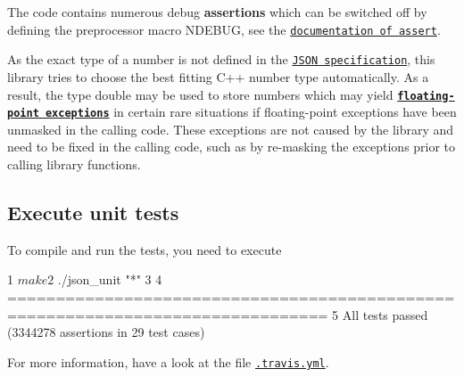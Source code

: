 \begin{DoxyItemize}
\item The code contains numerous debug {\bfseries assertions} which can be switched off by defining the preprocessor macro {\ttfamily N\+D\+E\+B\+UG}, see the \href{http://en.cppreference.com/w/cpp/error/assert}{\tt documentation of {\ttfamily assert}}.
\item As the exact type of a number is not defined in the \href{http://rfc7159.net/rfc7159}{\tt J\+S\+ON specification}, this library tries to choose the best fitting C++ number type automatically. As a result, the type {\ttfamily double} may be used to store numbers which may yield \href{https://github.com/nlohmann/json/issues/181}{\tt {\bfseries floating-\/point exceptions}} in certain rare situations if floating-\/point exceptions have been unmasked in the calling code. These exceptions are not caused by the library and need to be fixed in the calling code, such as by re-\/masking the exceptions prior to calling library functions.
\end{DoxyItemize}

\subsection*{Execute unit tests}

To compile and run the tests, you need to execute


\begin{DoxyCode}
1 $ make
2 $ ./json\_unit "*"
3 
4 ===============================================================================
5 All tests passed (3344278 assertions in 29 test cases)
\end{DoxyCode}


For more information, have a look at the file \href{https://github.com/nlohmann/json/blob/master/.travis.yml}{\tt .travis.\+yml}. 